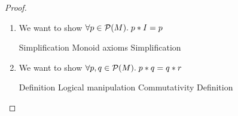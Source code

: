 \begin{proof}
\begin{enumerate}
\begin{tabbedproof}
    $\Leftarrow$ direction:\\
    \oo Assume $p \leq q \implies r$ \\
    \ooo By definition of $\leq$, we know $p \subseteq q \implies r$ \\
    \ooo We want to show $p \land q \leq r$ \\
    \ooo So we want to show $p \cap q \subseteq r$ \\
    \ooo So we want to show $\forall m$, if $m \in p \cap q$ then $m \in r$ \\
    \ooo Assume $m \in p \cap q$ \\
    \oooo Hence $m \in p$ and $m \in q$ \\
    \oooo Since $p \subseteq q \implies r$, we know for all $m$, if $m \in p$, then if $m \in q$, then $m \in r$ \\
    \oooo Hence $m \in r$ \\
    \ooo Hence $p \cap q \subseteq r$ \\
    \ooo By definition of $\leq$ and $\land$, we conclude $p \land q \leq r$ \\
  \end{tabbedproof}

\item We want to show $\forall p \in \mathcal{P}(M).\; p * I = p$

  \begin{eqnproof}
          {}
          {}
          {Simplification}
          {Monoid axioms}
          {Simplification}
          {}
  \end{eqnproof}

\item We want to show $\forall p, q \in \mathcal{P}(M).\; p * q = q * r$

  \begin{eqnproof}
          {Definition}
          {Logical manipulation}
          {Commutativity}
          {Definition}    
  \end{eqnproof}


\end{enumerate}
\end{proof}
